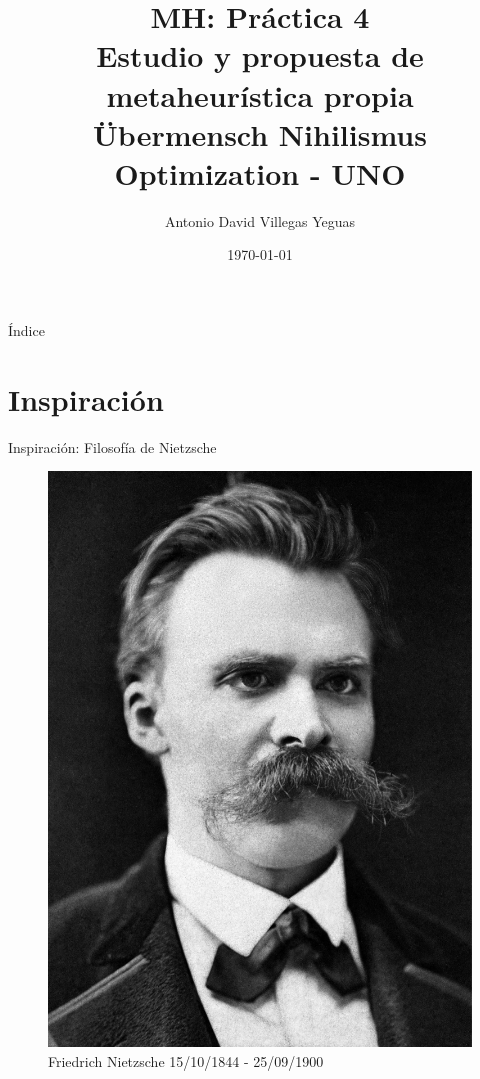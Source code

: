 \documentclass{beamer}
\title{MH: Práctica 4\\
			Estudio y propuesta de metaheurística propia\\ Übermensch Nihilismus Optimization - UNO}
\date{\today}
\author{Antonio David Villegas Yeguas}
\institute{Universidad de Granada\\
\medskip
\textit{advy99@correo.ugr.es}
}
\begin{document}
 \maketitle

\begin{frame}{Índice}
\tableofcontents
\end{frame}
  
  
\section{Inspiración}
\begin{frame}{Inspiración: Filosofía de Nietzsche}

	\begin{minipage}{0.3\textwidth}
    	\begin{figure}
   		 	\includegraphics[scale=0.26]{nietzsche.jpg}
    		\caption{\footnotesize{Friedrich Nietzsche 15/10/1844 - 25/09/1900}}
   	

\end{figure}
\end{minipage}
\end{frame}
\end{document}
